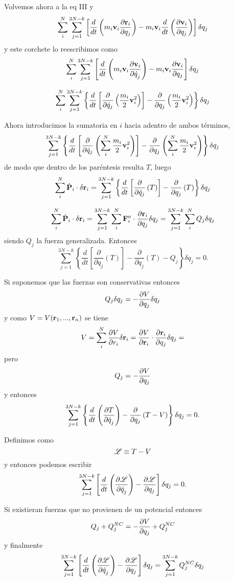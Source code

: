 \documentclass[10pt,oneside]{CBFT_article}
\begin{document}
Volvemos ahora a la eq III y 
\[
\sum_i^N \sum_{j=1}^{3N-k} \left[ 
\frac{d}{dt} \left( m_i \vb{v}_i \dpar{\vb{r}_i}{q_j} \right) -  m_i \vb{v}_i \frac{d}{dt}\left( \dpar{\vb{v}_i}{q_j} \right)
\right] \delta q_j
\]
y este corchete lo reescribimos como 
\[
\sum_i^N \sum_{j=1}^{3N-k} \left[ 
\frac{d}{dt} \left( m_i \vb{v}_i \dpar{\vb{v}_i}{\dot{q}_j} \right) -  m_i \vb{v}_i \dpar{\vb{v}_i}{q_j} 
\right] \delta q_j
\]

\[
\sum_i^N \sum_{j=1}^{3N-k} \left\{ 
\frac{d}{dt} \left[ \frac{\partial}{\partial \dot{q}_j} \left( \frac{m_i}{2} \vb{v}_i^2 \right) \right] - 
 \frac{\partial}{\partial q_j} \left( \frac{m_i}{2} \vb{v}_i^2 \right)
\right\} \delta q_j
\]

Ahora introducimos la sumatoria en $i$ hacia adentro de ambos términos,
\[
\sum_{j=1}^{3N-k} \left\{ 
\frac{d}{dt} \left[ \frac{\partial}{\partial \dot{q}_j} \left( \sum_i^N \frac{m_i}{2} \vb{v}_i^2 \right) \right] - 
 \frac{\partial}{\partial q_j} \left( \sum_i^N \frac{m_i}{2} \vb{v}_i^2 \right)
\right\} \delta q_j
\]
de modo que dentro de los paréntesis resulta $T$, luego 
\[
\sum_i^N \dot{\vb{P}}_i \cdot \delta \vb{r}_i = 
\sum_{j=1}^{3N-k} \left\{ 
\frac{d}{dt} \left[ \frac{\partial}{\partial \dot{q}_j} \left( T \right) \right] - 
 \frac{\partial}{\partial q_j} \left( T \right) \right\} \delta q_j
\]

\[
\sum_i^N \dot{\vb{P}}_i \cdot \delta \vb{r}_i = 
\sum_{j=1}^{3N-k} \sum_i^N \vb{F}_i^a \cdot \dpar{\vb{r}_i}{q_j} \delta q_j =  
\sum_{j=1}^{3N-k} \sum_i^N Q_j \delta q_j
\]
siendo $Q_j$ la fuerza generalizada. Entonces
\[
\sum_{j=1}^{3N-k} \left\{ \frac{d}{dt}
\left[ \frac{\partial}{\partial \dot{q}_j} \left( T \right) \right] - \frac{\partial}{\partial q_j} \left( T \right) - Q_j 
\right\} \delta q_j =  0.
\]

Si suponemos que las fuerzas son conservativas entonces 
\[
Q_j \delta q_j = -\frac{\partial^{\hspace{-0.05em}} {V}}{\partial {q_j}^{\hspace{-0.05em}}}\delta q_j
\]
y como $V=V(\vb{r}_1,...,\vb{r}_n)$ se tiene 
\[
V = \sum_i^N  \dpar{V}{r_i} \delta \vb{r}_i = \dpar{V}{\vb{r}_i} \cdot \dpar{\vb{r}_i}{q_j} \delta q_j =
\]
pero 
\[
Q_j = - \frac{\partial^{\hspace{-0.05em}} {V}}{\partial {q_j}^{\hspace{-0.05em}}}
\]
y entonces 
\[
\sum_{j=1}^{3N-k} \left\{ 
\frac{d}{dt} \left( \frac{\partial^{\hspace{-0.05em}} {T}}{\partial {\dot{q}_j}^{\hspace{-0.05em}}} \right) - \frac{\partial}{\partial q_j} \left( T - V \right) \right\} \delta q_j =  0.
\]

Definimos como 
\[
\mathscr{L} \equiv T - V
\]
y entonces podemos escribir
\[
\sum_{j=1}^{3N-k} \left[
\frac{d}{dt} \left( \frac{\partial^{\hspace{-0.05em}} {\mathscr{L}}}{\partial {\dot{q}_j}^{\hspace{-0.05em}}} \right) -  \frac{\partial^{\hspace{-0.05em}} {\mathscr{L}}}{\partial {q_j}^{\hspace{-0.05em}}} \right] \delta q_j =  0.
\]

Si existieran fuerzas que no provienen de un potencial entonces
\[
Q_j + Q_j^{NC} = -\frac{\partial^{\hspace{-0.05em}} {V}}{\partial {q_j}^{\hspace{-0.05em}}} + Q_j^{NC}
\]
y finalmente 
\[
\sum_{j=1}^{3N-k} \left[
\frac{d}{dt} \left( \frac{\partial^{\hspace{-0.05em}} {\mathscr{L}}}{\partial {\dot{q}_j}^{\hspace{-0.05em}}} \right) -  \frac{\partial^{\hspace{-0.05em}} {\mathscr{L}}}{\partial {q_j}^{\hspace{-0.05em}}} \right] \delta q_j = 
\sum_{j=1}^{3N-k} Q_j^{NC} \delta q_j
\]
\end{document}
